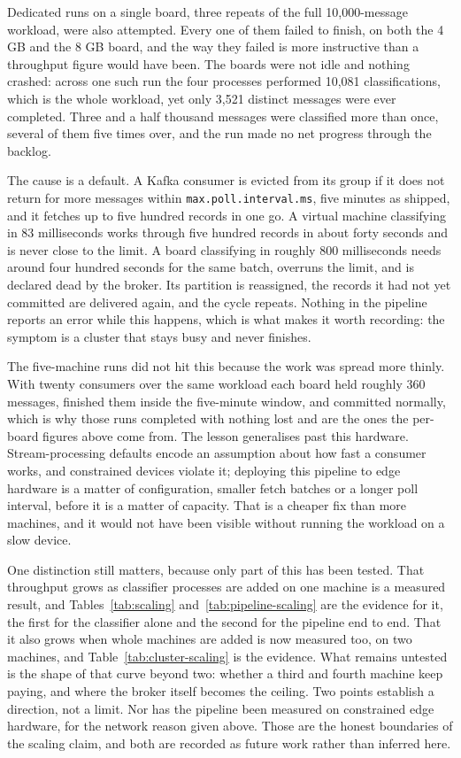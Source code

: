 Dedicated runs on a single board, three repeats of the full 10,000-message workload, were also attempted. Every one of them failed to finish, on both the 4 GB and the 8 GB board, and the way they failed is more instructive than a throughput figure would have been. The boards were not idle and nothing crashed: across one such run the four processes performed 10,081 classifications, which is the whole workload, yet only 3,521 distinct messages were ever completed. Three and a half thousand messages were classified more than once, several of them five times over, and the run made no net progress through the backlog.

The cause is a default. A Kafka consumer is evicted from its group if it does not return for more messages within \texttt{max.poll.interval.ms}, five minutes as shipped, and it fetches up to five hundred records in one go. A virtual machine classifying in 83 milliseconds works through five hundred records in about forty seconds and is never close to the limit. A board classifying in roughly 800 milliseconds needs around four hundred seconds for the same batch, overruns the limit, and is declared dead by the broker. Its partition is reassigned, the records it had not yet committed are delivered again, and the cycle repeats. Nothing in the pipeline reports an error while this happens, which is what makes it worth recording: the symptom is a cluster that stays busy and never finishes.

The five-machine runs did not hit this because the work was spread more thinly. With twenty consumers over the same workload each board held roughly 360 messages, finished them inside the five-minute window, and committed normally, which is why those runs completed with nothing lost and are the ones the per-board figures above come from. The lesson generalises past this hardware. Stream-processing defaults encode an assumption about how fast a consumer works, and constrained devices violate it; deploying this pipeline to edge hardware is a matter of configuration, smaller fetch batches or a longer poll interval, before it is a matter of capacity. That is a cheaper fix than more machines, and it would not have been visible without running the workload on a slow device.

One distinction still matters, because only part of this has been tested. That throughput grows as classifier processes are added on one machine is a measured result, and Tables~\ref{tab:scaling} and~\ref{tab:pipeline-scaling} are the evidence for it, the first for the classifier alone and the second for the pipeline end to end. That it also grows when whole machines are added is now measured too, on two machines, and Table~\ref{tab:cluster-scaling} is the evidence. What remains untested is the shape of that curve beyond two: whether a third and fourth machine keep paying, and where the broker itself becomes the ceiling. Two points establish a direction, not a limit. Nor has the pipeline been measured on constrained edge hardware, for the network reason given above. Those are the honest boundaries of the scaling claim, and both are recorded as future work rather than inferred here.

